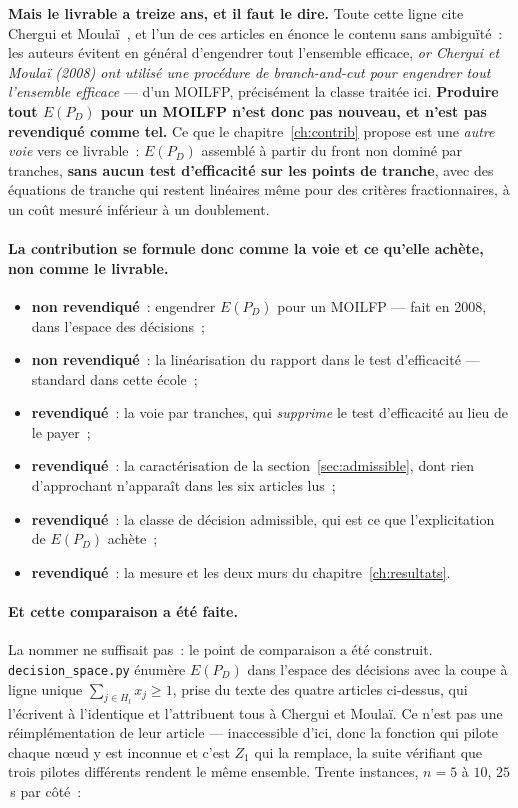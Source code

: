 \documentclass[12pt,a4paper]{report}
\newcommand{\E}{E(P_D)}
\newcommand{\Z}{Z}
\theoremstyle{plain}
\theoremstyle{definition}
\begin{document}
\textbf{Mais le livrable a treize ans, et il faut le dire.}  Toute cette
ligne cite Chergui et Moula\"i~\cite{cherguimoulai2008}, et l'un de ces
articles en énonce le contenu sans ambiguïté~: les auteurs évitent en
général d'engendrer tout l'ensemble efficace, \emph{or Chergui et Moula\"i
(2008) ont utilisé une procédure de branch-and-cut pour engendrer tout
l'ensemble efficace} --- d'un MOILFP, précisément la classe traitée ici.
\textbf{Produire tout $\E$ pour un MOILFP n'est donc pas nouveau, et n'est
pas revendiqué comme tel.}  Ce que le chapitre~\ref{ch:contrib} propose est
une \emph{autre voie} vers ce livrable~: $\E$ assemblé à partir du front
non dominé par tranches, \textbf{sans aucun test d'efficacité sur les points
de tranche}, avec des équations de tranche qui restent linéaires même pour
des critères fractionnaires, à un coût mesuré inférieur à un doublement.

\paragraph{La contribution se formule donc comme la voie et ce qu'elle
achète, non comme le livrable.}
\begin{itemize}[itemsep=3pt]
\item \textbf{non revendiqué}~: engendrer $\E$ pour un MOILFP --- fait en
      2008, dans l'espace des décisions~;
\item \textbf{non revendiqué}~: la linéarisation du rapport dans le test
      d'efficacité --- standard dans cette école~;
\item \textbf{revendiqué}~: la voie par tranches, qui \emph{supprime} le
      test d'efficacité au lieu de le payer~;
\item \textbf{revendiqué}~: la caractérisation de la
      section~\ref{sec:admissible}, dont rien d'approchant n'apparaît dans
      les six articles lus~;
\item \textbf{revendiqué}~: la classe de décision admissible, qui est ce que
      l'explicitation de $\E$ achète~;
\item \textbf{revendiqué}~: la mesure et les deux murs du
      chapitre~\ref{ch:resultats}.
\end{itemize}

\paragraph{Et cette comparaison a été faite.}
La nommer ne suffisait pas~: le point de comparaison a été construit.
\texttt{decision\_space.py} énumère $\E$ dans l'espace des décisions avec la
coupe à ligne unique $\sum_{j \in H_l} x_j \geqslant 1$, prise du texte des
quatre articles ci-dessus, qui l'écrivent à l'identique et l'attribuent tous
à Chergui et Moula\"i.  Ce n'est pas une réimplémentation de leur article ---
inaccessible d'ici, donc la fonction qui pilote chaque n{\oe}ud y est inconnue
et c'est $\Z_1$ qui la remplace, la suite vérifiant que trois pilotes
différents rendent le même ensemble.  Trente instances, $n = 5$ à $10$,
$25$\,s par côté~:
\end{document}
